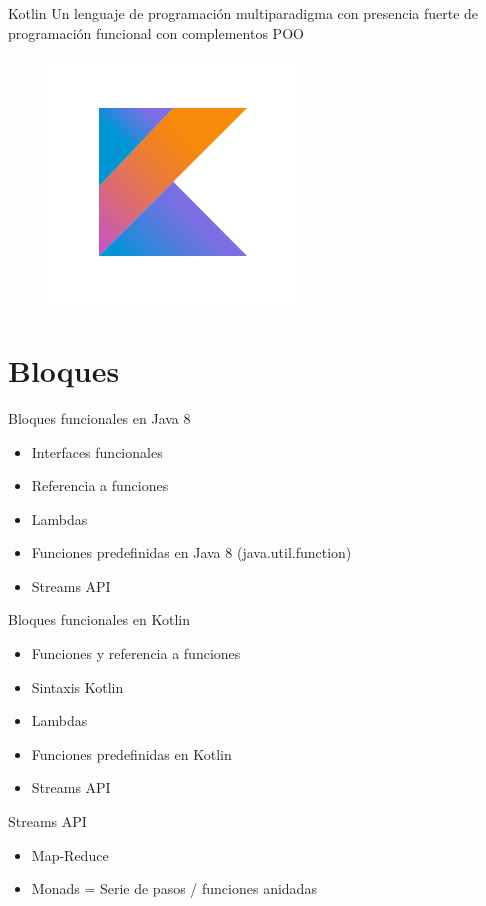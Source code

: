 \documentclass[14pt]{beamer}
\begin{document}
\begin{frame}{Kotlin}
Un lenguaje de programación multiparadigma con presencia fuerte de programación funcional con complementos POO
\begin{figure}
	\centering
	\includegraphics[width=0.5\linewidth]{Images/kotlin}
\end{figure}
\end{frame}

\section{Bloques}

\begin{frame}{Bloques funcionales en Java 8}
\begin{itemize}
\item Interfaces funcionales
\item Referencia a funciones
\item Lambdas
\item Funciones predefinidas en Java 8 (java.util.function)
\item Streams API
\end{itemize}
\end{frame}


\begin{frame}{Bloques funcionales en Kotlin}
\begin{itemize}
	\item Funciones y referencia a funciones
	\item Sintaxis Kotlin
	\item Lambdas
	\item Funciones predefinidas en Kotlin
	\item Streams API
\end{itemize}
\end{frame}


\begin{frame}[fragile]{Streams API}
\begin{itemize}
	\item Map-Reduce
	\item Monads = Serie de pasos / funciones anidadas
\end{itemize}

\end{frame}
\end{document}
